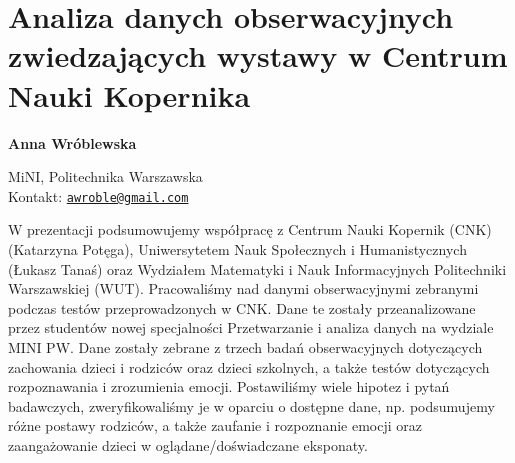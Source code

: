 \documentclass[\main/boa.tex]{subfiles}
\begin{document}
\section{Analiza danych obserwacyjnych zwiedzających wystawy w Centrum Nauki Kopernika}


\begin{minipage}{0.915\textwidth}
	\centering
  {\bf \huge {} Anna Wróblewska}
\end{minipage}


\vskip 0.3cm

\begin{affiliations}
\begin{minipage}{0.915\textwidth}
\centering
\large MiNI, Politechnika Warszawska  \\[5pt]
Kontakt: \href{mailto:awroble@gmail.com}{\nolinkurl{awroble@gmail.com}}\\
\end{minipage}
\end{affiliations}

\vskip 0.8cm
W prezentacji podsumowujemy współpracę z Centrum Nauki Kopernik (CNK) (Katarzyna Potęga), Uniwersytetem Nauk Społecznych i Humanistycznych (Łukasz Tanaś) oraz Wydziałem Matematyki i Nauk Informacyjnych Politechniki Warszawskiej (WUT). Pracowaliśmy nad danymi obserwacyjnymi zebranymi podczas testów przeprowadzonych w CNK. Dane te zostały przeanalizowane przez studentów nowej specjalności Przetwarzanie i analiza danych na wydziale MINI PW.
Dane zostały zebrane z trzech badań obserwacyjnych dotyczących zachowania dzieci i rodziców oraz dzieci szkolnych, a także testów dotyczących rozpoznawania i zrozumienia emocji.
Postawiliśmy wiele hipotez i pytań badawczych, zweryfikowaliśmy je w oparciu o dostępne dane, np. podsumujemy różne postawy rodziców, a także zaufanie i rozpoznanie emocji oraz zaangażowanie dzieci w oglądane/doświadczane eksponaty. 
\end{document}
